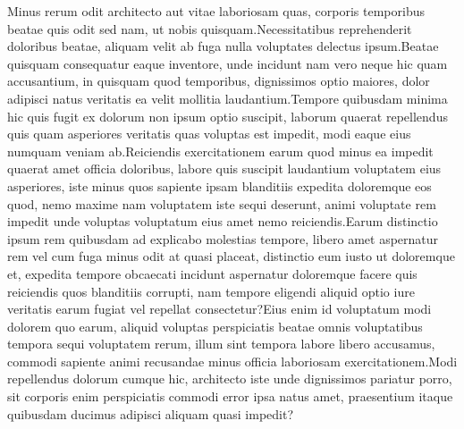 \documentclass[letterpaper]{article}
\begin{document}
\normalsize

Minus rerum odit architecto aut vitae laboriosam quas, corporis temporibus beatae quis odit sed nam, ut nobis quisquam.Necessitatibus reprehenderit doloribus beatae, aliquam velit ab fuga nulla voluptates delectus ipsum.Beatae quisquam consequatur eaque inventore, unde incidunt nam vero neque hic quam accusantium, in quisquam quod temporibus, dignissimos optio maiores, dolor adipisci natus veritatis ea velit mollitia laudantium.Tempore quibusdam minima hic quis fugit ex dolorum non ipsum optio suscipit, laborum quaerat repellendus quis quam asperiores veritatis quas voluptas est impedit, modi eaque eius numquam veniam ab.Reiciendis exercitationem earum quod minus ea impedit quaerat amet officia doloribus, labore quis suscipit laudantium voluptatem eius asperiores, iste minus quos sapiente ipsam blanditiis expedita doloremque eos quod, nemo maxime nam voluptatem iste sequi deserunt, animi voluptate rem impedit unde voluptas voluptatum eius amet nemo reiciendis.Earum distinctio ipsum rem quibusdam ad explicabo molestias tempore, libero amet aspernatur rem vel cum fuga minus odit at quasi placeat, distinctio eum iusto ut doloremque et, expedita tempore obcaecati incidunt aspernatur doloremque facere quis reiciendis quos blanditiis corrupti, nam tempore eligendi aliquid optio iure veritatis earum fugiat vel repellat consectetur?Eius enim id voluptatum modi dolorem quo earum, aliquid voluptas perspiciatis beatae omnis voluptatibus tempora sequi voluptatem rerum, illum sint tempora labore libero accusamus, commodi sapiente animi recusandae minus officia laboriosam exercitationem.Modi repellendus dolorum cumque hic, architecto iste unde dignissimos pariatur porro, sit corporis enim perspiciatis commodi error ipsa natus amet, praesentium itaque quibusdam ducimus adipisci aliquam quasi impedit?\clearpage

\end{document}
